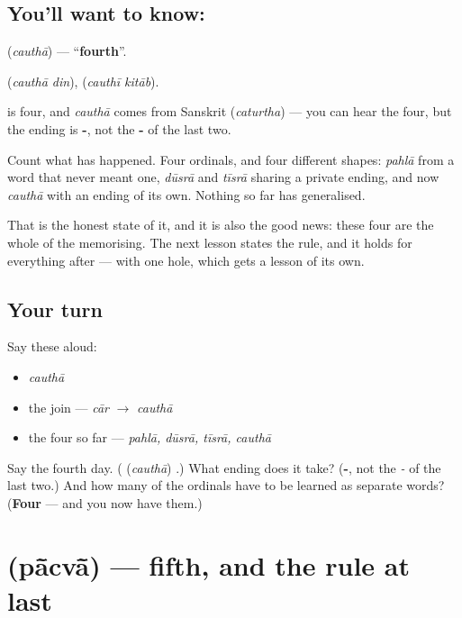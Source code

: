 \subsection*{You'll want to know: }
\textbf{} (\emph{cauthā}) — \textquotedblleft{}\textbf{fourth}\textquotedblright{}.

\textbf{ } (\emph{cauthā din}), \textbf{ } (\emph{cauthī kitāb}).

\textbf{} is four, and \emph{cauthā} comes from Sanskrit \textbf{} (\emph{caturtha}) — you can hear the four, but the ending is \textbf{-}, not the \textbf{-} of the last two.

Count what has happened. Four ordinals, and four different shapes: \emph{pahlā} from a word that never meant one, \emph{dūsrā} and \emph{tīsrā} sharing a private ending, and now \emph{cauthā} with an ending of its own. Nothing so far has generalised.

That is the honest state of it, and it is also the good news: these four are the whole of the memorising. The next lesson states the rule, and it holds for everything after — with one hole, which gets a lesson of its own.

\subsection*{Your turn}
Say these aloud:

\begin{itemize}
\raggedright
  \item \emph{cauthā}
  \item the join — \emph{cār} $\to$ \emph{cauthā}
  \item the four so far — \emph{pahlā, dūsrā, tīsrā, cauthā}
\end{itemize}

\begin{tcolorbox}[breakable,colback=teal!4,colframe=teal!35!black,title={Before you move on}]
Say the fourth day. (\textbf{} (\emph{cauthā}) \textbf{}.) What ending does it take? (\textbf{-}, not the \emph{-} of the last two.) And how many of the ordinals have to be learned as separate words? (\textbf{Four} — and you now have them.)
\end{tcolorbox}
\section[\texorpdfstring{\hi{पाँचवाँ} / \hi{पाँचवीं} … (pā̃cvā̃ / pā̃cvī̃ …)}{पाँचवाँ / पाँचवीं … (pā̃cvā̃ / pā̃cvī̃ …)}]{ (pā̃cvā̃) — fifth, and the rule at last}


